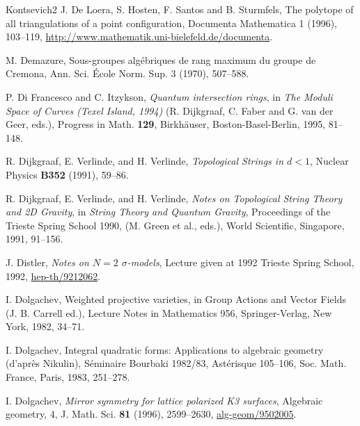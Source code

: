 \begin{thebibliography}{Kontsevich2}
\hypertarget{bib:DHSS}{}
J. De Loera, S. Hosten, F. Santos and B. Sturmfels, The polytope of all triangulations
of a point configuration, Documenta Mathematica 1 (1996), 103--119,
\url{http://www.mathematik.uni-bielefeld.de/documenta}.

\hypertarget{bib:Demazure}{}
M. Demazure, Sous-groupes algébriques de rang maximum du groupe de Cremona,
Ann. Sci. École Norm. Sup. 3 (1970), 507--588.

\hypertarget{bib:DI}{} P. Di Francesco and C. Itzykson, \emph{Quantum intersection rings}, in \emph{The Moduli Space of Curves (Texel Island, 1994)} (R. Dijkgraaf, C. Faber and G. van der Geer, eds.), Progress in Math. \textbf{129}, Birkhäuser, Boston-Basel-Berlin, 1995, 81--148.

\hypertarget{bib:DVV1}{} R. Dijkgraaf, E. Verlinde, and H. Verlinde, \emph{Topological Strings in $d<1$}, Nuclear Physics \textbf{B352} (1991), 59--86.

\hypertarget{bib:DVV2}{} R. Dijkgraaf, E. Verlinde, and H. Verlinde, \emph{Notes on Topological String Theory and 2D Gravity}, in \emph{String Theory and Quantum Gravity}, Proceedings of the Trieste Spring School 1990, (M. Green et al., eds.), World Scientific, Singapore, 1991, 91--156.

\hypertarget{bib:Distler}{} J. Distler, \emph{Notes on $N=2$ $\sigma$-models}, Lecture given at 1992 Trieste Spring School, 1992, \href{https://arxiv.org/abs/hep-th/9212062}{hep-th/9212062}.

\hypertarget{bib:Dolgachev1}{}
I. Dolgachev, Weighted projective varieties, in Group Actions and Vector Fields
(J. B. Carrell ed.), Lecture Notes in Mathematics 956, Springer-Verlag,
New York, 1982, 34--71.


\hypertarget{bib:Dolgachev2}{}
I. Dolgachev, Integral quadratic forms: Applications to algebraic geometry
(d'après Nikulin), Séminaire Bourbaki 1982/83, Astérisque 105--106,
Soc. Math. France, Paris, 1983, 251--278.

\hypertarget{bib:Dolgachev3}{} I. Dolgachev, \emph{Mirror symmetry for lattice polarized K3 surfaces}, Algebraic geometry, 4, J. Math. Sci. \textbf{81} (1996), 2599--2630, \href{https://arxiv.org/abs/alg-geom/9502005}{alg-geom/9502005}.


\end{thebibliography}

